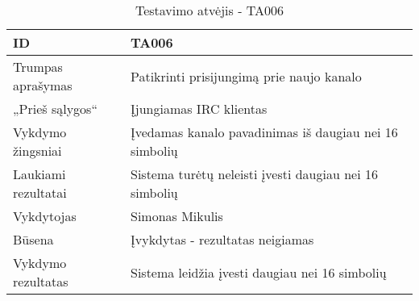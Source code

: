 \begin{table}[H]
  \centering
  \label{table:TA006}
  \begin{tabular}{|l|l|}
    \hline
    ID                  & TA006                                                                  \\ \hline
    Trumpas aprašymas   & Patikrinti prisijungimą prie naujo kanalo                              \\ \hline
    „Prieš sąlygos“     & Įjungiamas IRC klientas                                                \\ \hline
    Vykdymo žingsniai   & Įvedamas kanalo pavadinimas iš daugiau nei 16 simbolių                 \\ \hline
    Laukiami rezultatai & Sistema turėtų neleisti įvesti daugiau nei 16 simbolių                 \\ \hline
    Vykdytojas          & Simonas Mikulis                                                        \\ \hline
    Būsena              & Įvykdytas - rezultatas neigiamas                                       \\ \hline
    Vykdymo rezultatas  & \cellcolor[HTML]{FF0000}Sistema leidžia įvesti daugiau nei 16 simbolių \\ \hline
  \end{tabular}
  \caption{Testavimo atvėjis - TA006}
\end{table}

